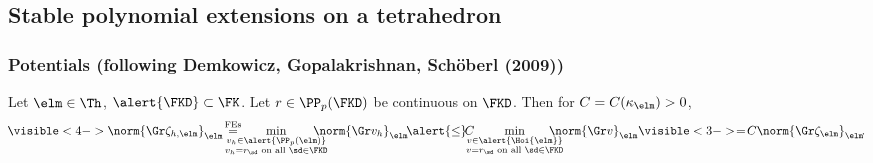 \documentclass[compress]{beamer}
\begin{document}
\subsection[Stable polynomial extensions]{Stable polynomial extensions on a tetrahedron}

\begin{frame}
\frametitle{Potentials (following {\scriptsize Demkowicz, Gopalakrishnan,
Sch{\"o}berl (2009)})}

 Let $\elm \in \Th$,
$\alert{\FKD} \subset \FK$. Let $r \in \PP_{p}(\FKD)$ be continuous on
$\FKD$. Then for $C=C(\kappa_{\elm})
> 0$,
%
\[
    \!\visible<4->{\norm{\Gr \zeta_{h,\elm}}_\elm \! \stackrel{\text{FEs}}{=}} \!\!\!\!\!\!\!\!\!\min_{\substack{v_h \in \alert{\PP_p(\elm)}\\
    v_h = r_\sd \text{ on all } \sd \in \FKD}} \!\!\!\!\!\!\!\! \norm{\Gr v_h}_\elm
    \! \alert{\leq} \! C \!\!\!\!\! \min_{\substack{v \in \alert{\Hoi{\elm}}\\
    v = r_\sd \text{ on all } \sd \in \FKD}} \!\!\!\!\!\!\!\! \norm{\Gr v}_\elm \visible<3->{\! = \! C \norm{\Gr \zeta_\elm}_\elm}\!.
\]
%
\el


\end{frame}
\end{document}
